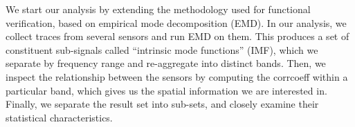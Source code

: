 


We start our analysis by extending the methodology used for functional verification, based on empirical mode decomposition (EMD).  
In our analysis, we collect traces from several sensors and run EMD on them.  This produces a set of 
constituent sub-signals called ``intrinsic mode functions'' (IMF), which we separate by frequency range and re-aggregate into distinct bands.
Then, we inspect the relationship between the sensors by computing the corrcoeff within a particular band, which 
gives us the spatial information we are interested in. 
Finally, we separate the result set into sub-sets, and closely examine their statistical characteristics. 



